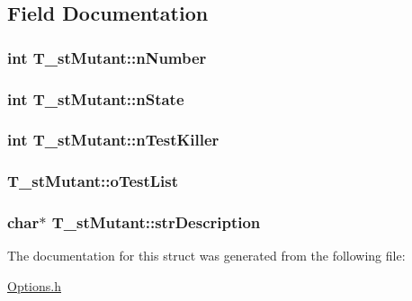 \subsection{Field Documentation}
\hypertarget{structT__stMutant_aa786929cdfa4a262bb6d760443b3025d}{
\subsubsection[{n\-Number}]{\setlength{\rightskip}{0pt plus 5cm}int T\-\_\-st\-Mutant\-::n\-Number}}\label{structT__stMutant_aa786929cdfa4a262bb6d760443b3025d}
\hypertarget{structT__stMutant_ada5890ac8d2defb9096bc5dcef0965ee}{
\subsubsection[{n\-State}]{\setlength{\rightskip}{0pt plus 5cm}int T\-\_\-st\-Mutant\-::n\-State}}\label{structT__stMutant_ada5890ac8d2defb9096bc5dcef0965ee}
\hypertarget{structT__stMutant_a4e9fc72bb0ca2c52d21f7622514b0106}{
\subsubsection[{n\-Test\-Killer}]{\setlength{\rightskip}{0pt plus 5cm}int T\-\_\-st\-Mutant\-::n\-Test\-Killer}}\label{structT__stMutant_a4e9fc72bb0ca2c52d21f7622514b0106}
\hypertarget{structT__stMutant_a526593dc889002d1c2cd1ee66c9b6325}{
\subsubsection[{o\-Test\-List}]{ T\-\_\-st\-Mutant\-::o\-Test\-List}}\label{structT__stMutant_a526593dc889002d1c2cd1ee66c9b6325}
\hypertarget{structT__stMutant_a0593f27426124cd3d47d8e032b08d56e}{
\subsubsection[{str\-Description}]{\setlength{\rightskip}{0pt plus 5cm}char$\ast$ T\-\_\-st\-Mutant\-::str\-Description}}\label{structT__stMutant_a0593f27426124cd3d47d8e032b08d56e}


The documentation for this struct was generated from the following file\-:\begin{DoxyCompactItemize}
\item 
\hyperlink{Options_8h}{Options.\-h}\end{DoxyCompactItemize}
